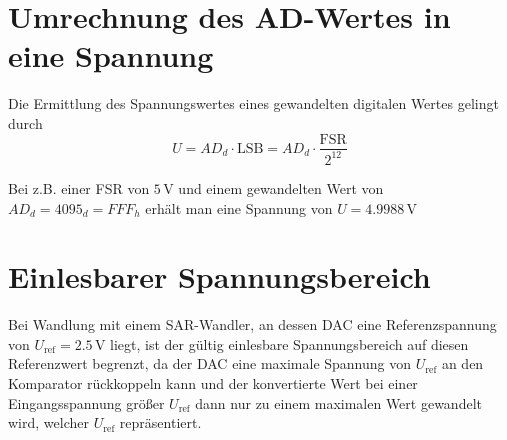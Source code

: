 \documentclass[a4paper, 12pt]{article}
\begin{document}
  \section{Umrechnung des AD-Wertes in eine Spannung}
  Die Ermittlung des Spannungswertes eines gewandelten digitalen Wertes gelingt durch
  \[ U = AD_{d} \cdot \mathrm{LSB} = AD_{d} \cdot \frac{\mathrm{FSR}}{2^{12}}\]

  Bei z.B. einer FSR von $5 \, \si{\volt}$ und einem gewandelten Wert von
  $AD_{d} = 4095_d = FFF_h $ erhält man eine Spannung von $U=4.9988 \, \si{\volt}$

  \section{Einlesbarer Spannungsbereich}
  Bei Wandlung mit einem SAR-Wandler, an dessen DAC eine Referenzspannung von
  $U_{\mathrm{ref}} = 2.5 \, \si{\volt}$ liegt, ist der gültig einlesbare
  Spannungsbereich auf diesen Referenzwert begrenzt, da der DAC eine maximale
  Spannung von $U_{\mathrm{ref}}$ an den Komparator rückkoppeln kann und der
  konvertierte Wert bei einer Eingangsspannung größer $U_\mathrm{ref}$ dann nur
  zu einem maximalen Wert  gewandelt wird, welcher
  $U_{\mathrm{ref}}$ repräsentiert.

  
\end{document}

